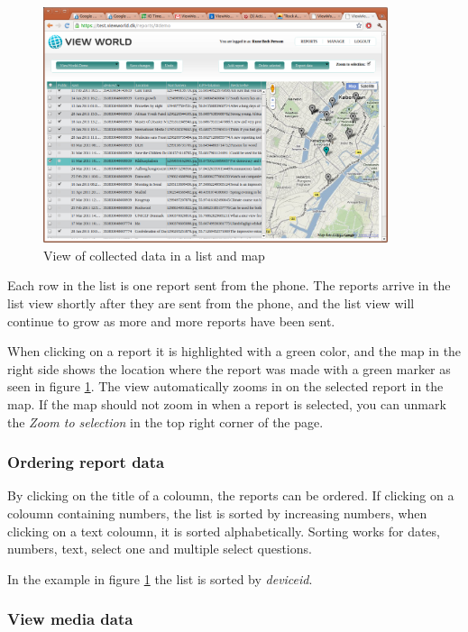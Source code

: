 \documentclass[a4paper, 12pt, final]{article}
\begin{document}
\begin{figure}[H]
  \centering
      \includegraphics[width=0.9\textwidth]{pics/web_view_demo_data.png}
  \caption{View of collected data in a list and map}
  \label{fig:web_view_demo_data}
\end{figure}

Each row in the list is one report sent from the phone. The reports arrive in the list view shortly after they are sent from the phone, and the list view will continue to grow as more and more reports have been sent. 

When clicking on a report it is highlighted with a green color, and the map in the right side shows the location where the report was made with a green marker as seen in figure \ref{fig:web_view_demo_data}. The view automatically zooms in on the selected report in the map. If the map should not zoom in when a report is selected, you can unmark the \emph{Zoom to selection} in the top right corner of the page.

\subsubsection{Ordering report data}

By clicking on the title of a coloumn, the reports can be ordered. If clicking on a coloumn containing numbers, the list is sorted by increasing numbers, when clicking on a text coloumn, it is sorted alphabetically. Sorting works for dates, numbers, text, select one and multiple select questions.

In the example in figure \ref{fig:web_view_demo_data} the list is sorted by \emph{deviceid}.

\subsubsection{View media data}
\end{document}
